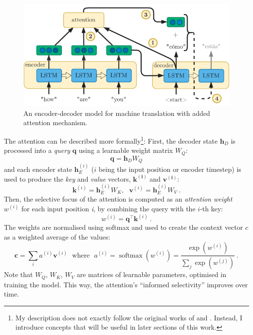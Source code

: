 \documentclass[bsc,frontabs,twoside,singlespacing,parskip,deptreport]{infthesis}
\DeclareMathOperator{\softmax}{softmax}
\begin{document}
{{    \begin{figure}[h!t]
      \centering
      \includegraphics[width=11.5cm]{graphics/encoder-decoder-att}
      \cprotect\caption{An encoder-decoder model for machine translation with added attention mechanism.}
      \label{fig:encoder-decoder-att}
    \end{figure}
    
    The attention can be described more formally\footnote{My description does not exactly follow the original works of \citet{Bahdanau_2014} and \citet{Luong_2015}. Instead, I introduce concepts that will be useful in later sections of this work.}: First, the decoder state $\bm{h}_D$ is processed into a \textit{query} $\bm{q}$ using a learnable weight matrix $W_Q$:
    \begin{equation}
    \bm{q}=\bm{h}_DW_Q
    \end{equation}
    and each encoder state $\bm{h}_E^{(i)}$ ($i$ being the input position or encoder timestep) is used to produce the \textit{key} and \textit{value} vectors, $\bm{k^{(i)}}$ and $\bm{v^{(i)}}$:
    \begin{equation}
    \bm{k}^{(i)} = \bm{h}_E^{(i)}W_K,\ \ \ \bm{v}^{(i)} = \bm{h}_E^{(i)}W_V\ .
    \end{equation}
    Then, the selective focus of the attention is computed as an \textit{attention weight} $w^{(i)}$ for each input position \textit{i}, by combining the query with the $i$-th key:
    \begin{equation}
    w^{(i)}=\bm{q}^\top\bm{k}^{(i)}\ .
    \end{equation}
    The weights are normalised using softmax and used to create the context vector $c$ as a weighted average of the values:
    \begin{equation}
    \bm{c}=\sum_{i}a^{(i)}\bm{v}^{(i)}\ \ \ \textrm{where}\ \ \ a^{(i)}=\softmax(w^{(i)})=\frac{\exp{(w^{(i)})}}{\sum_{j}\exp{(w^{(j)})}}\ .
    \end{equation}
    Note that $W_Q$, $W_K$, $W_V$ are matrices of learnable parameters, optimised in training the model. This way, the attention's ``informed selectivity'' improves over time.
    
}}
\end{document}
